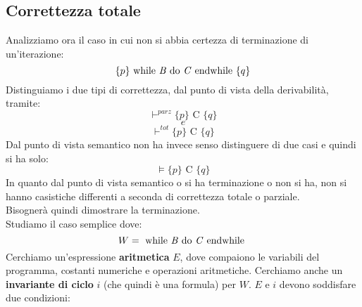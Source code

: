 				      				\subsection{Correttezza totale}
				      				Analizziamo ora il caso in cui non si abbia certezza di terminazione di
				      				un'iterazione:
				      				\[\{p\}\mbox{ while \textit{B} do \textit{C} endwhile }\{q\}\]
				      				Distinguiamo i due tipi di correttezza, dal punto di vista della derivabilità,
				      				tramite: 
				      				\[\vdash^{parz}\{p\}\mbox{ C }\{q\}\]
				      				\[e\]
				      				\[\vdash^{tot}\{p\}\mbox{ C }\{q\}\]
				      				Dal punto di vista semantico non ha invece senso distinguere di due casi e
				      				quindi si ha solo:
				      				\[\vDash\{p\}\mbox{ C }\{q\}\]
				      				In quanto dal punto di vista semantico o si ha terminazione o non si ha, non si
				      				hanno casistiche differenti a seconda di correttezza totale o parziale.\\
				      				Bisognerà quindi dimostrare la terminazione.\\
				      				Studiamo il caso semplice dove:
				      				\[W=\mbox{ while \textit{B} do \textit{C} endwhile }\]
				      				Cerchiamo un'espressione \textbf{aritmetica} $E$, dove compaiono le variabili del
				      				programma, costanti numeriche e operazioni aritmetiche. Cerchiamo anche un
				      				\textbf{invariante di ciclo} $i$ (che quindi è una formula) per $W$. $E$ e $i$
				      				devono soddisfare due condizioni:

